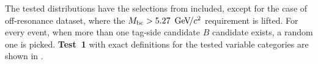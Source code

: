The tested distributions have the selections from  included, except for the case of off-resonance dataset, where the ${M_{\mathrm{bc}}}>5.27~{\mathrm{\,Ge\kern -0.1em V\!/}c^2}$ requirement is lifted.
For every event, when more than one tag-side candidate $B$ candidate exists, a random one is picked.
\textbf{Test~1} with exact definitions for the tested variable categories are shown in .



